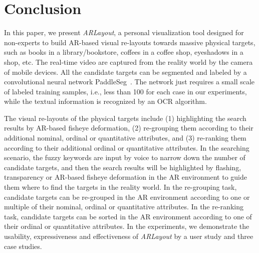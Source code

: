 \section{Conclusion}



In this paper, we present \textit{ARLayout}, a personal visualization tool designed
for non-experts to build AR-based visual re-layouts towards massive physical targets,
such as books in a library/bookstore, coffees in a coffee shop, eyeshadows in a shop, etc.
The real-time video are captured from the reality world by the camera of
mobile devices.
All the candidate targets can be segmented and labeled by
a convolutional neural network PaddleSeg~\cite{Liu2019,Liu2021a}.
The network just requires a small scale of labeled training
samples, i.e., less than 100 for each case in our experiments,
while the textual information is recognized by an OCR algorithm.

The visual re-layouts of the physical targets include (1) highlighting
the search results by AR-based fisheye deformation,
(2) re-grouping them according to their additional nominal,
ordinal or quantitative attributes,
and (3) re-ranking them according to their additional ordinal or quantitative attributes.
In the searching scenario, the fuzzy keywords are input by voice to narrow down the number of candidate targets,
and then the search results will be highlighted by flashing, transparency or AR-based fisheye deformation
in the AR environment to guide them where to find the targets in the reality world.
In the re-grouping task, candidate targets can be re-grouped in the AR environment
according to one or multiple of their nominal, ordinal or quantitative attributes.
In the re-ranking task, candidate targets can be sorted in the AR environment according to one of
their ordinal or quantitative attributes.
In the experiments, we demonstrate the usability, expressiveness and effectiveness
of \textit{ARLayout} by a user study and three case studies.

